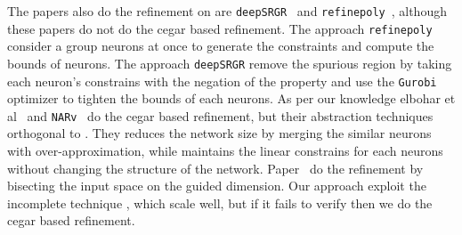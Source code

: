  The papers also do the refinement on \deeppoly{} are \texttt{deepSRGR}~\cite{yang2021improving} and
 \texttt{refinepoly}~\cite{singh2019beyond}, 
 although these papers do not do the cegar based refinement. The approach \texttt{refinepoly} consider 
 a group neurons at once to generate the constraints and compute the bounds of neurons. 
 The approach \texttt{deepSRGR} remove the 
 spurious region by taking each neuron's constrains with the negation of the property and use the 
 \texttt{Gurobi}~\cite{gurobioptimizer} optimizer to tighten the bounds of each neurons. 
 As per our knowledge elbohar et al~\cite{elboher2020abstraction} and \texttt{NARv}~\cite{liu2022abstraction} 
 do the cegar based refinement, but their abstraction techniques orthogonal to \deeppoly{}. 
 They reduces the network size by merging the similar 
 neurons with over-approximation, while \deeppoly{} maintains the linear constrains for each neurons without changing the 
 structure of the network. Paper~\cite{lin2020art} do the refinement by bisecting the input space on the guided dimension. 
 Our approach exploit the incomplete technique \deeppoly{},
 which scale well, but if it fails to verify then we do the cegar based refinement.
 
